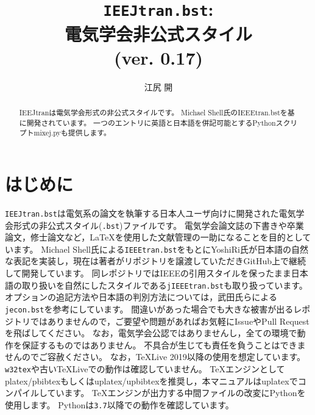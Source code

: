 \documentclass[11pt, a4paper, dvipdfmx, uplatex]{jsarticle}
\title{\texttt{IEEJtran.bst}:\\電気学会非公式\BibTeX スタイル\\(ver. 0.17)}
\author{江尻 開}
\begin{document}
\maketitle

\begin{abstract}
IEEJtranは電気学会形式の非公式\BibTeX スタイルです。
Michael Shell氏のIEEEtran.bstを基に開発されています。
一つのエントリに英語と日本語を併記可能とするPythonスクリプトmixej.pyも提供します。
\end{abstract}


\section{はじめに}

\texttt{IEEJtran.bst}は電気系の論文を執筆する日本人ユーザ向けに開発された電気学会形式の非公式\BibTeX スタイル(\texttt{.bst})ファイルです。
電気学会論文誌の下書きや卒業論文，修士論文など，\LaTeX を使用した文献管理の一助になることを目的としています。
Michael Shell氏による\texttt{IEEEtran.bst}\cite{IEEEtran}をもとにYoshiRi氏が日本語の自然な表記を実装し，現在は著者がリポジトリを譲渡していただきGitHub上\cite{jIEEEtran}で継続して開発しています。
同レポジトリではIEEEの引用スタイルを保ったまま日本語の取り扱いを自然にした\BibTeX スタイルである\texttt{jIEEEtran.bst}も取り扱っています。
オプションの追記方法や日本語の判別方法については，武田氏らによる\texttt{jecon.bst}\cite{jeconbst}を参考にしています。
間違いがあった場合でも大きな被害が出るレポジトリではありませんので，ご要望や問題があればお気軽にIssueやPull Requestを飛ばしてください。
なお，電気学会公認ではありませんし，全ての環境で動作を保証するものではありません。
不具合が生じても責任を負うことはできませんのでご容赦ください。
なお，\TeX Live 2019以降の使用を想定しています。
\texttt{w32tex}や古い\TeX Liveでの動作は確認していません。
\TeX エンジンとしてplatex/pbibtexもしくはuplatex/upbibtexを推奨し，本マニュアルはuplatexでコンパイルしています。
\TeX エンジンが出力する中間ファイルの改変にPythonを使用します。
Pythonは\texttt{3.7}以降での動作を確認しています。
\end{document}
